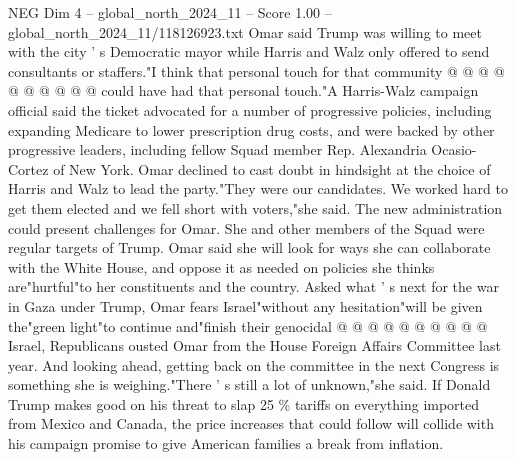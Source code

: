 \begin{textsample}{NEG Dim 4 – global\_north\_2024\_11 – Score 1.00 – global\_north\_2024\_11/118126923.txt}
Omar said Trump was willing to meet with the city ' s Democratic mayor while Harris and Walz only offered to send consultants or staffers."I think that personal touch for that community @ @ @ @ @ @ @ @ @ @ could have had that personal touch."A Harris-Walz campaign official said the ticket advocated for a number of progressive policies, including expanding Medicare to lower prescription drug costs, and were backed by other progressive leaders, including fellow Squad member Rep.
Alexandria Ocasio-Cortez of New York.
Omar declined to cast doubt in hindsight at the choice of Harris and Walz to lead the party."They were our candidates.
We worked hard to get them elected and we fell short with voters,"she said.
The new administration could present challenges for Omar.
She and other members of the Squad were regular targets of Trump.
Omar said she will look for ways she can collaborate with the White House, and oppose it as needed on policies she thinks are"hurtful"to her constituents and the country.
Asked what ' s next for the war in Gaza under Trump, Omar fears Israel"without any hesitation"will be given the"green light"to continue and"finish their genocidal @ @ @ @ @ @ @ @ @ @ Israel, Republicans ousted Omar from the House Foreign Affairs Committee last year.
And looking ahead, getting back on the committee in the next Congress is something she is weighing."There ' s still a lot of unknown,"she said.
If Donald Trump makes good on his threat to slap 25 \% tariffs on everything imported from Mexico and Canada, the price increases that could follow will collide with his campaign promise to give American families a break from inflation.

\end{textsample}
